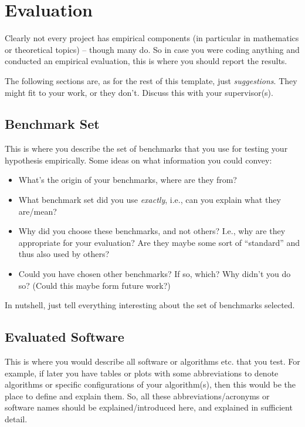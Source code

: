 \chapter{Evaluation}\label{chap:evaluation}

Clearly not every project has empirical components (in particular in mathematics or theoretical topics) -- though many do. So in case you were coding anything and conducted an empirical evaluation, this is where you should report the results.

The following sections are, as for the rest of this template, just \emph{suggestions}. They might fit to your work, or they don't. Discuss this with your supervisor(s).


\section{Benchmark Set}

This is where you describe the set of benchmarks that you use for testing your hypothesis empirically. Some ideas on what information you could convey:

\begin{itemize}
  \item What's the origin of your benchmarks, where are they from?
  \item What benchmark set did you use \emph{exactly}, i.e., can you explain what they are/mean?
  \item Why did you choose these benchmarks, and not others? I.e., why are they appropriate for your evaluation? Are they maybe some sort of ``standard'' and thus also used by others?
  \item Could you have chosen other benchmarks? If so, which? Why didn't you do so? (Could this maybe form future work?)
\end{itemize}

In nutshell, just tell everything interesting about the set of benchmarks selected.


\section{Evaluated Software}

This is where you would describe all software or algorithms etc. that you test. For example, if later you have tables or plots with some abbreviations to denote algorithms or specific configurations of your algorithm(s), then this would be the place to define and explain them. So, all these abbreviations/acronyms or software names should be explained/introduced here, and explained in sufficient detail.

